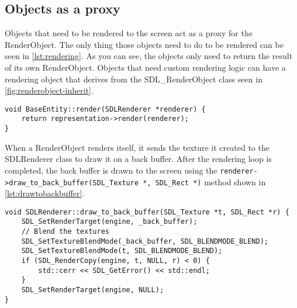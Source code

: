 \subsection{Objects as a proxy}
\label{sec:rendering-proxy}

Objects that need to be rendered to the screen act as a proxy for the 
RenderObject. The only thing those objects need to do to be rendered can be 
seen in \cref{lst:rendering}. As you can see, the objects only need to return 
the result of its own RenderObject. Objects that need custom rendering logic 
can have a rendering object that derives from the SDL\_RenderObject class seen 
in \cref{fig:renderobject-inherit}.
\\
\begin{lstlisting}[caption={Rendering proxy.},label={lst:rendering}]
void BaseEntity::render(SDLRenderer *renderer) {
    return representation->render(renderer);
}
\end{lstlisting}

When a RenderObject renders itself, it sends the texture it created to the 
SDLRenderer class to draw it on a back buffer. After the rendering loop is 
completed, the back buffer is drawn to the screen using the 
\lstinline{renderer->draw_to_back_buffer(SDL_Texture *, SDL_Rect *)} 
method shown in \cref{lst:drawtobackbuffer}.
\\

\begin{lstlisting}[caption={Drawing to the back buffer.},
label={lst:drawtobackbuffer}]
void SDLRenderer::draw_to_back_buffer(SDL_Texture *t, SDL_Rect *r) {
    SDL_SetRenderTarget(engine, _back_buffer);
    // Blend the textures
    SDL_SetTextureBlendMode(_back_buffer, SDL_BLENDMODE_BLEND);
    SDL_SetTextureBlendMode(t, SDL_BLENDMODE_BLEND);
    if (SDL_RenderCopy(engine, t, NULL, r) < 0) {
        std::cerr << SDL_GetError() << std::endl;
    }
    SDL_SetRenderTarget(engine, NULL);
}
\end{lstlisting}
